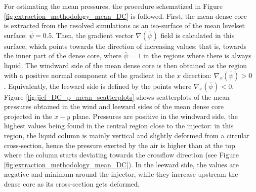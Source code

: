 For estimating the mean pressures, the procedure schematized in Figure \ref{fig:extraction_methodology_mean_DC} is followed. First, the mean dense core is extracted from the resolved simulations as an iso-surface of the mean levelset surface: $\overline{\psi} = 0.5$. Then, the gradient vector $\nabla \left( \overline{\psi} \right)$ field is calculated in this surface, which points towards the direction of increasing values: that is, towards the inner part of the dense core, where $\overline{\psi} = 1$ in the regions where there is always liquid. The windward side of the mean dense core is then obtained as the region with a positive normal component of the gradient in the $x$ direction: $\nabla_x \left( \overline{\psi} \right) > 0$. Equivalently, the leeward side is defined by the points where $\nabla_x \left( \overline{\psi} \right) < 0$. Figure \ref{fig:jicf_DC_p_mean_scatterplots} shows scatterplots of the mean pressures obtained in the wind and leeward sides of the mean dense core projected in the $x-y$ plane. Pressures are positive in the windward side, the highest values being found in the central region close to the injector: in this region, the liquid column is mainly vertical and slightly deformed from a circular cross-section, hence the pressure exerted by the air is higher than at the top where the column starts deviating towards the crossflow direction (see Figure \ref{fig:extraction_methodology_mean_DC}). In the leeward side, the values are negative and minimum around the injector, while they increase upstream the dense core as its cross-section gets deformed. 


